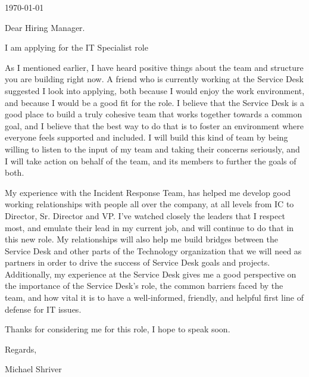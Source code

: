 \documentclass[10pt,oneside]{article}
\begin{document}
\hfill\dte\today
\heading
\vspace{\baselineskip}
\vspace{\baselineskip}

Dear Hiring Manager.

\vspace{\baselineskip}

I am applying for the IT Specialist role 

\vspace{\baselineskip}

As I mentioned earlier, I have heard positive things about the team and structure you are building right now. A friend who is currently working at the Service Desk suggested I look into applying, both because I would enjoy the work environment, and because I would be a good fit for the role. I believe that the Service Desk is  a good place to build a truly cohesive team that works together towards a common goal, and I believe that the best way to do that is to foster an environment where everyone feels supported and included. I will build this kind of team by being willing to listen to the input of my team and taking their concerns seriously, and I will take action on behalf of the team, and its members to further the goals of both.

\vspace{\baselineskip}

My experience with the Incident Response Team, has helped me develop good working relationships with people all over the company, at all levels from IC to Director, Sr. Director and VP. I've watched closely the leaders that I respect most, and emulate their lead in my current job, and will continue to do that in this new role. My relationships will also help me build bridges between the Service Desk and other parts of the Technology organization that we will need as partners in order to drive the success of Service Desk goals and projects. Additionally, my experience at the Service Desk gives me a good perspective on the importance of the Service Desk's role, the common barriers faced by the team, and how vital it is to have a well-informed, friendly, and helpful first line of defense for IT issues.

\vspace{\baselineskip}

Thanks for considering me for this role, I hope to speak soon.

\vspace{\baselineskip}

Regards,

\vspace{\baselineskip}

Michael Shriver
\end{document}
